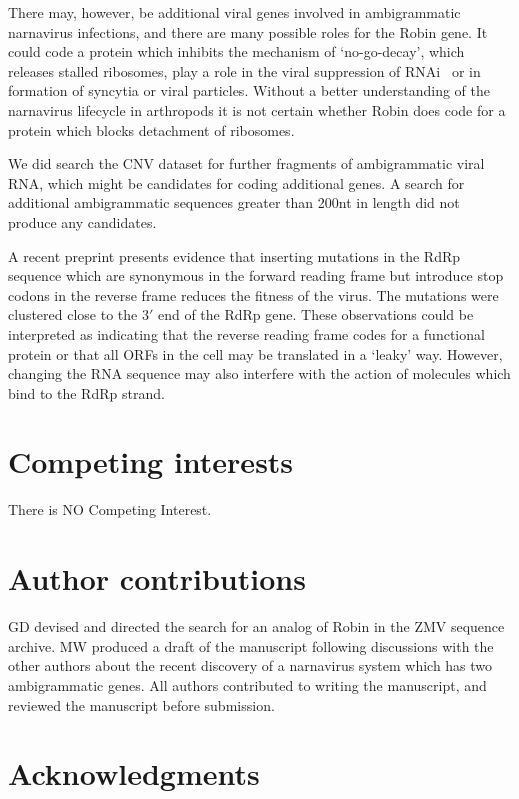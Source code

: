 \documentclass[unnumsec,webpdf,contemporary,large,namedate]{oup-authoring-template}%
\theoremstyle{thmstyleone}%
\theoremstyle{thmstyletwo}%
\theoremstyle{thmstylethree}%
\begin{document}
There may, however, be additional viral genes involved in ambigrammatic narnavirus 
infections, and there are many possible roles for the Robin gene. It could code a protein which inhibits 
the mechanism of \lq no-go-decay', which releases stalled ribosomes, play a role in the 
viral suppression of RNAi~\citep{mie_14} or in formation of syncytia or viral particles. 
Without a better understanding of the narnavirus lifecycle in arthropods it is not certain whether 
Robin does code for a protein which blocks detachment of ribosomes. 

We did search the CNV dataset for further fragments of ambigrammatic viral RNA, which might be 
candidates for coding additional genes. A search for additional ambigrammatic sequences greater than 200nt 
in length did not produce any candidates.

A recent preprint \citep{Ret+20}
presents evidence that inserting mutations in the RdRp sequence which are synonymous in the forward
reading frame but introduce stop codons in the reverse frame reduces the fitness of the virus. The mutations
were clustered close to the $3'$ end of the RdRp gene. These
observations could be interpreted as indicating that the reverse reading frame codes for a functional
protein or that all ORFs in the cell may be translated in a \lq leaky' way.
However, changing the RNA sequence may also interfere with the action of molecules which
bind to the RdRp strand.

\section{Competing interests}
There is NO Competing Interest.

\section{Author contributions}

GD devised and directed the search for an analog of Robin in the ZMV sequence
archive. MW produced a draft of the manuscript following discussions with the other
authors about the recent discovery of a narnavirus system which has two
ambigrammatic genes. All authors contributed to writing the manuscript, and
reviewed the manuscript before submission.


\section{Acknowledgments}
\end{document}
